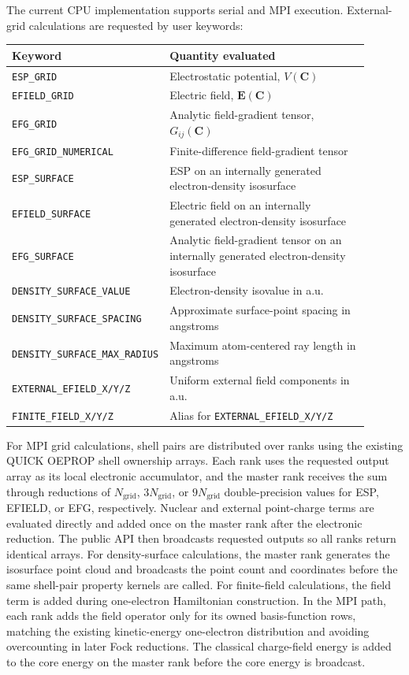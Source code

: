 \documentclass[journal=jcisd8,manuscript=article]{achemso}
\newcommand{\quickkeyword}[1]{\texttt{#1}}
\begin{document}
The current CPU implementation supports serial and MPI execution.  External-grid calculations are requested by user keywords:
\begin{center}
\small
\begin{tabular}{p{0.34\linewidth}p{0.56\linewidth}}
\toprule
Keyword & Quantity evaluated \\
\midrule
\quickkeyword{ESP\_GRID} & Electrostatic potential, \(V(\mathbf{C})\) \\
\quickkeyword{EFIELD\_GRID} & Electric field, \(\mathbf{E}(\mathbf{C})\) \\
\quickkeyword{EFG\_GRID} & Analytic field-gradient tensor, \(G_{ij}(\mathbf{C})\) \\
\quickkeyword{EFG\_GRID\_\allowbreak NUMERICAL} & Finite-difference field-gradient tensor \\
\quickkeyword{ESP\_SURFACE} & ESP on an internally generated electron-density isosurface \\
\quickkeyword{EFIELD\_SURFACE} & Electric field on an internally generated electron-density isosurface \\
\quickkeyword{EFG\_SURFACE} & Analytic field-gradient tensor on an internally generated electron-density isosurface \\
\quickkeyword{DENSITY\_SURFACE\_VALUE} & Electron-density isovalue in a.u. \\
\quickkeyword{DENSITY\_SURFACE\_SPACING} & Approximate surface-point spacing in angstroms \\
\quickkeyword{DENSITY\_SURFACE\_\allowbreak MAX\_RADIUS} & Maximum atom-centered ray length in angstroms \\
\quickkeyword{EXTERNAL\_EFIELD\_X/Y/Z} & Uniform external field components in a.u. \\
\quickkeyword{FINITE\_FIELD\_X/Y/Z} & Alias for \quickkeyword{EXTERNAL\_EFIELD\_X/Y/Z} \\
\bottomrule
\end{tabular}
\end{center}

For MPI grid calculations, shell pairs are distributed over ranks using the existing QUICK OEPROP shell ownership arrays.  Each rank uses the requested output array as its local electronic accumulator, and the master rank receives the sum through reductions of \(N_{\mathrm{grid}}\), \(3N_{\mathrm{grid}}\), or \(9N_{\mathrm{grid}}\) double-precision values for ESP, EFIELD, or EFG, respectively.  Nuclear and external point-charge terms are evaluated directly and added once on the master rank after the electronic reduction.  The public API then broadcasts requested outputs so all ranks return identical arrays.  For density-surface calculations, the master rank generates the isosurface point cloud and broadcasts the point count and coordinates before the same shell-pair property kernels are called.  For finite-field calculations, the field term is added during one-electron Hamiltonian construction.  In the MPI path, each rank adds the field operator only for its owned basis-function rows, matching the existing kinetic-energy one-electron distribution and avoiding overcounting in later Fock reductions.  The classical charge-field energy is added to the core energy on the master rank before the core energy is broadcast.
\end{document}
